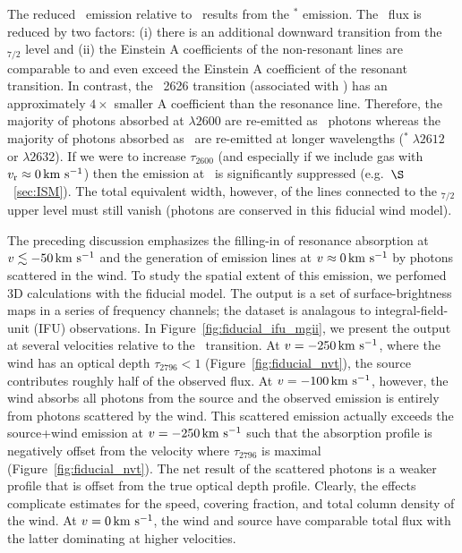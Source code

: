 \documentclass[12pt,preprint]{aastex}
\begin{document}
The reduced \feiia\ emission relative to \feiib\ results from the
$^*$ emission.
The \feiia\ flux is reduced by two factors:
(i) there is an additional downward transition from the
\zconfig$_{7/2}$ level and 
(ii) the Einstein A
coefficients of the non-resonant lines are comparable to and even
exceed the Einstein A coefficient of
the resonant transition.  In contrast, 
the ~2626 transition (associated with \feiib)
has an approximately  $4\times$ smaller A coefficient than the
resonance line.  Therefore, the majority of photons absorbed at
$\lambda 2600$ are re-emitted as \feiib\ photons whereas 
the majority of photons absorbed as \feiia\ are re-emitted 
at longer wavelengths ($^* \; \lambda 2612$ or $\lambda
2632$).
If we were to increase $\tau_{2600}$ (and especially if we include
gas with $v_{\rm r} \approx 0 \, {\rm km~s^{-1}}$) then the emission at \feiib\ is
significantly suppressed (e.g.\ $\S$~\ref{sec:ISM}).
The total equivalent width, however, of the lines connected to the
\zconfig$_{7/2}$ upper level must still vanish (photons are conserved
in this fiducial wind model).


The preceding discussion emphasizes the filling-in of resonance absorption at $v
\lesssim -50 \, {\rm km~s^{-1}}$ and the generation of emission lines at $v \approx
0 \, {\rm km~s^{-1}}$ by photons scattered in the wind.  To study the spatial
extent of this emission, we perfomed 3D calculations with the fiducial
model.  The output is a set of surface-brightness maps in a series of
frequency channels; the
dataset is analagous to integral-field-unit (IFU) observations.  In
Figure~\ref{fig:fiducial_ifu_mgii}, we present the output 
at several velocities relative to the \mgiia\
transition. At $v = -250 \, {\rm km~s^{-1}}$, where the wind has an optical
depth $\tau_{2796} < 1$ (Figure~\ref{fig:fiducial_nvt}),
the source contributes roughly half of the observed flux.  
At $v=-100 \, {\rm km~s^{-1}}$, however, the
wind absorbs all photons from the source and the observed emission is
entirely from photons scattered by the wind.  This scattered emission
actually exceeds the source+wind emission at 
$v = -250 \, {\rm km~s^{-1}}$ such
that the absorption profile is
negatively offset from the velocity where $\tau_{2796}$ is maximal
(Figure~\ref{fig:fiducial_nvt}).
The net result of the scattered photons is
a weaker  profile that is offset from the true optical
depth profile.  Clearly, the effects complicate estimates for the
speed, covering fraction, and total column density of the wind.  At $v
= 0 \, {\rm km~s^{-1}}$, the wind and source have comparable total flux with the
latter dominating at higher velocities.  
\end{document}
